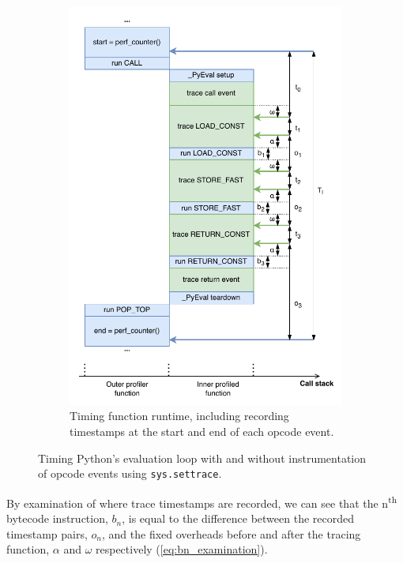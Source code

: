 \begin{figure}[H]
\begin{subfigure}[b]{0.45\textwidth}
       \includegraphics[width=\textwidth]{images/profiling_bytecode/traced_run.drawio.pdf}
       \caption{Timing function runtime, including recording timestamps at the start and end of each opcode event.}
       \label{figure:profiler-traced-run}
    \end{subfigure}
    \caption{Timing Python's evaluation loop with and without instrumentation of opcode events using \texttt{sys.settrace}.}
    \label{figure:profiler-run}
\end{figure}

By examination of where trace timestamps are recorded, we can see that the n\textsuperscript{th} bytecode instruction, $b_n$, is equal to the difference between the recorded timestamp pairs, $o_n$, and the fixed overheads before and after the tracing function, $\alpha$ and $\omega$ respectively (\autoref{eq:bn_examination}).

